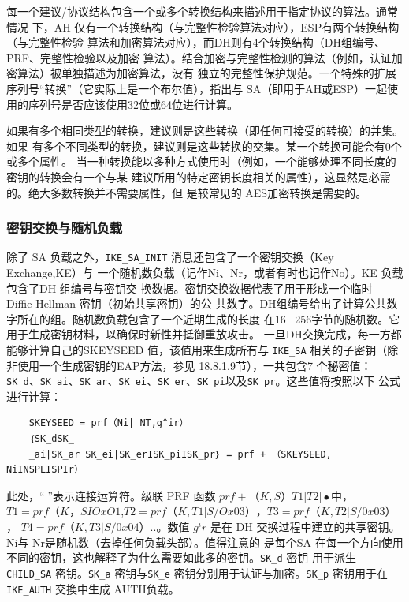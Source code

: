 每一个建议/协议结构包含一个或多个转换结构来描述用于指定协议的算法。通常情况
下，AH 仅有一个转换结构（与完整性检验算法对应），ESP有两个转换结构（与完整性检验
算法和加密算法对应），而DH则有4个转换结构（DH组编号、PRF、完整性检验以及加密
算法）。结合加密与完整性检测的算法（例如，认证加密算法）被单独描述为加密算法，没有
独立的完整性保护规范。一个特殊的扩展序列号“转换”（它实际上是一个布尔值），指出与
SA（即用于AH或ESP）一起使用的序列号是否应该使用32位或64位进行计算。

如果有多个相同类型的转换，建议则是这些转换（即任何可接受的转换）的并集。如果
有多个不同类型的转换，建议则是这些转换的交集。某一个转换可能会有0个或多个属性。
当一种转换能以多种方式使用时（例如，一个能够处理不同长度的密钥的转换会有一个与某
建议所用的特定密钥长度相关的属性），这显然是必需的。绝大多数转换并不需要属性，但
是较常见的 AES加密转换是需要的。

\subsubsection{密钥交换与随机负载}

除了 SA 负载之外，\verb|IKE_SA_INIT| 消息还包含了一个密钥交换（Key Exchange,KE）与
一个随机数负载（记作Ni、Nr，或者有时也记作No）。KE 负载包含了DH 组编号与密钥交
换数据。密钥交换数据代表了用于形成一个临时 Diffie-Hellman 密钥（初始共享密钥）的公
共数字。DH组编号给出了计算公共数字所在的组。随机数负载包含了一个近期生成的长度
在16 ~256字节的随机数。它用于生成密钥材料，以确保时新性并抵御重放攻击。
一旦DH交换完成，每一方都能够计算自己的SKEYSEED 值，该值用来生成所有与
\verb|IKE_SA| 相关的子密钥（除非使用一个生成密钥的EAP方法，参见 18.8.1.9节），一共包含7
个秘密值：\verb|SK_d|、\verb|SK_ai|、\verb|SK_ar|、\verb|SK_ei|、\verb|SK_er|、\verb|SK_pi|以及\verb|SK_pr|。这些值将按照以下
公式进行计算：

\begin{verbatim}
    SKEYSEED = prf（Ni| NT,g^ir）
    ｛SK_dSK_
    _ai|SK_ar SK_ei|SK_erISK_piISK_pr｝ = prf + （SKEYSEED, NiINSPLISPIr）
\end{verbatim}

此处，“|”表示连接运算符。级联 PRF 函数 $prf+ （K, S）T1 | T2|•$中，$T1 = prf（K，
SIOxO1$,$T2 = prf（K, T1|S/Ox03）$，$T3 = prf（K, T2|S/0x03）$， $T4 = prf（K, T3|S/0x04）..。$数值 $g^ir$
是在 DH 交换过程中建立的共享密钥。Ni与 Nr是随机数（去掉任何负载头部）。值得注意的
是每个SA 在每一个方向使用不同的密钥，这也解释了为什么需要如此多的密钥。\verb|SK_d| 密钥
用于派生 \verb|CHILD_SA| 密钥。\verb|SK_a| 密钥与\verb|SK_e| 密钥分别用于认证与加密。\verb|SK_p| 密钥用于在
\verb|IKE_AUTH| 交換中生成 AUTH负载。

